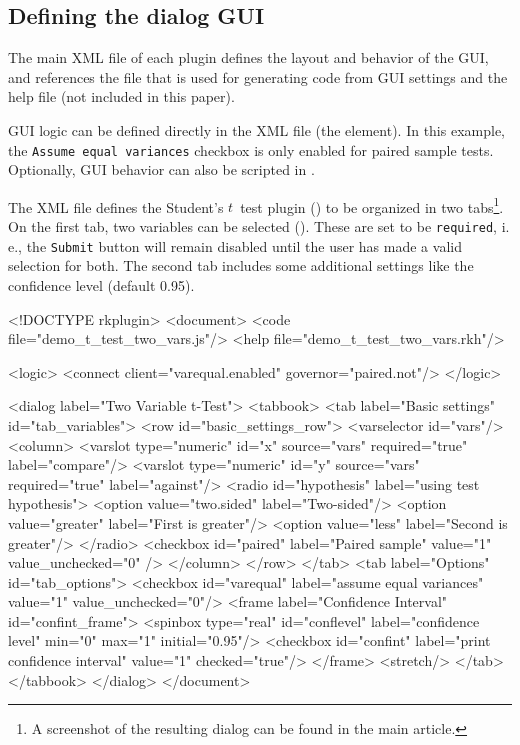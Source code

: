 \documentclass[article,shortnames]{jss}
\begin{document}
\subsection {Defining the dialog GUI}
\label{sec:defining_dialog_ui}
The main XML file of each plugin defines the layout and behavior of the GUI, and references the
 file that is used for generating  code from GUI settings and the help file (not included in this paper).

GUI logic can be defined directly in the XML file (the  element).
In this example, the \texttt{Assume equal variances} checkbox is only enabled for paired sample tests.
Optionally, GUI behavior can also be scripted in .

The XML file defines the Student's $t$~test plugin () to be organized in two tabs\footnote{
  A screenshot of the resulting dialog can be found in the main article.
}.
On the first tab, two variables can be selected (). These are set to be \texttt{required}, i.\,e.,
the \texttt{Submit} button will remain disabled until the user has made a valid selection for both. The second tab includes some
additional settings like the confidence level (default 0.95).

\begin{footnotesize}
\begin{Code}
<!DOCTYPE rkplugin>
<document>
  <code file="demo_t_test_two_vars.js"/>
  <help file="demo_t_test_two_vars.rkh"/>

  <logic>
    <connect client="varequal.enabled" governor="paired.not"/>
  </logic>

  <dialog label="Two Variable t-Test">
    <tabbook>
      <tab label="Basic settings" id="tab_variables">
        <row id="basic_settings_row">
          <varselector id="vars"/>
          <column>
            <varslot type="numeric" id="x" source="vars" required="true"
              label="compare"/>                                                             
            <varslot type="numeric" id="y" source="vars" required="true"
              label="against"/>
            <radio id="hypothesis" label="using test hypothesis">
              <option value="two.sided" label="Two-sided"/>
              <option value="greater" label="First is greater"/>
              <option value="less" label="Second is greater"/>
            </radio>
            <checkbox id="paired" label="Paired sample" value="1" value_unchecked="0" />
          </column>
        </row>
      </tab>
      <tab label="Options" id="tab_options">
        <checkbox id="varequal" label="assume equal variances" value="1"
          value_unchecked="0"/>
        <frame label="Confidence Interval" id="confint_frame">
          <spinbox type="real" id="conflevel" label="confidence level" min="0" max="1"
            initial="0.95"/>
          <checkbox id="confint" label="print confidence interval" value="1"
            checked="true"/>
        </frame>
        <stretch/>
      </tab>
    </tabbook>
  </dialog>
</document>
\end{Code}
\end{footnotesize}
\end{document}
